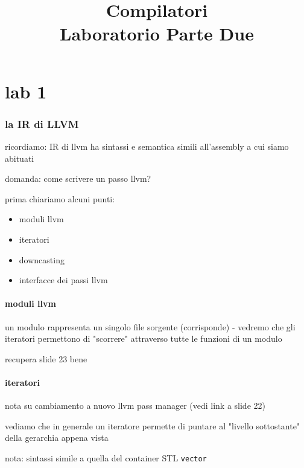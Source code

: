 

\title{%
Compilatori\\
\large Laboratorio Parte Due}


\maketitle
\tableofcontents
\newpage
\part{lab 1}

\section{la IR di LLVM}

ricordiamo: IR di llvm ha sintassi e semantica simili all'assembly a cui siamo abituati

domanda: come scrivere un passo llvm?

prima chiariamo alcuni punti:
\begin{itemize}
  \item moduli llvm
  \item iteratori
  \item downcasting
  \item interfacce dei passi llvm
\end{itemize}

\subsection{moduli llvm}

un modulo rappresenta un singolo file sorgente (corrisponde) - vedremo che gli iteratori permettono di "scorrere" attraverso tutte le funzioni di un modulo

recupera slide 23 bene



\subsection{iteratori}

nota su cambiamento a nuovo llvm pass manager (vedi link a slide 22)

vediamo che in generale un iteratore permette di puntare al "livello sottostante" della gerarchia appena vista

nota: sintassi simile a quella del container STL \lstinline|vector|


